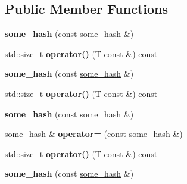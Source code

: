 \subsection*{Public Member Functions}
\begin{DoxyCompactItemize}
\item 
\mbox{\label{structsome__hash_a723612fc40aa55a03af0ba2a04ba66c2}} 
{\bfseries some\+\_\+hash} (const \mbox{\hyperlink{structsome__hash}{some\+\_\+hash}} \&)
\item 
\mbox{\label{structsome__hash_a2796c87fba10362bbbcf115a7166ecc0}} 
std\+::size\+\_\+t {\bfseries operator()} (\mbox{\hyperlink{struct_t}{T}} const \&) const
\item 
\mbox{\label{structsome__hash_a723612fc40aa55a03af0ba2a04ba66c2}} 
{\bfseries some\+\_\+hash} (const \mbox{\hyperlink{structsome__hash}{some\+\_\+hash}} \&)
\item 
\mbox{\label{structsome__hash_a2796c87fba10362bbbcf115a7166ecc0}} 
std\+::size\+\_\+t {\bfseries operator()} (\mbox{\hyperlink{struct_t}{T}} const \&) const
\item 
\mbox{\label{structsome__hash_a723612fc40aa55a03af0ba2a04ba66c2}} 
{\bfseries some\+\_\+hash} (const \mbox{\hyperlink{structsome__hash}{some\+\_\+hash}} \&)
\item 
\mbox{\label{structsome__hash_a0cea7e5f4ab9f595fe686e3d1356969a}} 
\mbox{\hyperlink{structsome__hash}{some\+\_\+hash}} \& {\bfseries operator=} (const \mbox{\hyperlink{structsome__hash}{some\+\_\+hash}} \&)
\item 
\mbox{\label{structsome__hash_a2796c87fba10362bbbcf115a7166ecc0}} 
std\+::size\+\_\+t {\bfseries operator()} (\mbox{\hyperlink{struct_t}{T}} const \&) const
\item 
\mbox{\label{structsome__hash_a723612fc40aa55a03af0ba2a04ba66c2}} 
{\bfseries some\+\_\+hash} (const \mbox{\hyperlink{structsome__hash}{some\+\_\+hash}} \&)
\item 
\mbox{\label{structsome__hash_a2796c87fba10362bbbcf115a7166ecc0}} 

\end{DoxyCompactItemize}
